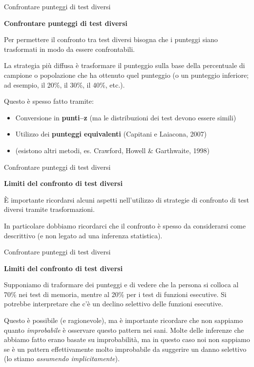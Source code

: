 \documentclass[
  ignorenonframetext,
]{beamer}
\providecommand{\tightlist}{%
  \setlength{\itemsep}{0pt}\setlength{\parskip}{0pt}}
\begin{document}
\begin{frame}{Confrontare punteggi di test diversi}
\label{confrontare-punteggi-di-test-diversi-1}
\begin{center}
  \textbf{Confrontare punteggi di test diversi}
\end{center}

Per permettere il confronto tra test diversi bisogna che i punteggi
siano trasformati in modo da essere confrontabili.

La strategia più diffusa è trasformare il punteggio sulla base della
percentuale di campione o popolazione che ha ottenuto quel punteggio (o
un punteggio inferiore; ad esempio, il 20\%, il 30\%, il 40\%, etc.).

Questo è spesso fatto tramite:

\begin{itemize}
\tightlist
\item
  Conversione in \textbf{punti--z} (ma le distribuzioni dei test devono
  essere simili)
\item
  Utilizzo dei \textbf{punteggi equivalenti} (Capitani e Laiacona, 2007)
\item
  (esistono altri metodi, es. Crawford, Howell \& Garthwaite, 1998)
\end{itemize}
\end{frame}

\begin{frame}{Confrontare punteggi di test diversi}
\label{confrontare-punteggi-di-test-diversi-2}
\begin{center}
  \textbf{Limiti del confronto di test diversi}
\end{center}
\vspace{2em}

È importante ricordarsi alcuni aspetti nell'utilizzo di strategie di
confronto di test diversi tramite trasformazioni.

In particolare dobbiamo ricordarci che il confronto è spesso da
considerarsi come descrittivo (e non legato ad una inferenza
statistica).
\end{frame}

\begin{frame}{Confrontare punteggi di test diversi}
\label{confrontare-punteggi-di-test-diversi-3}
\begin{center}
  \textbf{Limiti del confronto di test diversi}
\end{center}
\vspace{2em}

Supponiamo di traformare dei punteggi e di vedere che la persona si
colloca al 70\% nei test di memoria, mentre al 20\% per i test di
funzioni esecutive. Si potrebbe interpretare che c'è un declino
selettivo delle funzioni esecutive.

Questo è possibile (e ragionevole), ma è importante ricordare che non
sappiamo quanto \emph{improbabile} è osservare questo pattern nei sani.
Molte delle inferenze che abbiamo fatto erano basate su improbabilità,
ma in questo caso noi non sappiamo se è un pattern effettivamente molto
improbabile da suggerire un danno selettivo (lo stiamo \emph{assumendo
implicitamente}).
\end{frame}
\end{document}
